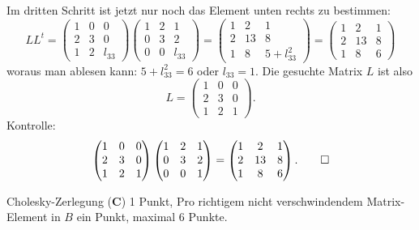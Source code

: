 \begin{loesung}
Im dritten Schritt ist jetzt nur noch das Element unten rechts zu bestimmen:
\[
LL^t=
\begin{pmatrix}
1&0&     0\\
2&3&     0\\
1&2&l_{33}
\end{pmatrix}
\begin{pmatrix}
1&2&     1\\
0&3&     2\\
0&0&l_{33}
\end{pmatrix}
=
\begin{pmatrix}
1& 2&1\\
2&13&8\\
1& 8&5+l_{33}^2
\end{pmatrix}
=
\begin{pmatrix}
1& 2&1\\
2&13&8\\
1& 8&6
\end{pmatrix}
\]
woraus man ablesen kann: $5+l_{33}^2=6$ oder $l_{33}=1$. Die gesuchte
Matrix $L$ ist also
\[
L=
\begin{pmatrix}
1&0&0\\
2&3&0\\
1&2&1
\end{pmatrix}.
\]
Kontrolle:
\[
\begin{pmatrix}
1&0&0\\
2&3&0\\
1&2&1
\end{pmatrix}
\begin{pmatrix}
1&2&1\\
0&3&2\\
0&0&1
\end{pmatrix}
=
\begin{pmatrix}
1& 2&1\\
2&13&8\\
1& 8&6
\end{pmatrix}.
\qedhere
\]
\end{loesung}

\begin{bewertung}
Cholesky-Zerlegung ({\bf C}) 1 Punkt,
Pro richtigem nicht verschwindendem Matrix-Element in $B$ ein Punkt,
maximal 6 Punkte.
\end{bewertung}

